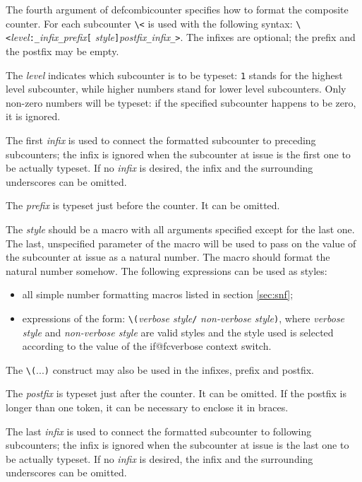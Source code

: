 \documentclass[11pt]{article}
\makeatletter
\def\macroname#1{{\ttfamily\@ttbs#1}}  %
\def\={\verb=}
\def\<#1>{\macroname{#1}}
\makeatother
\begin{document}
The fourth argument of \<defcombicounter> specifies how to format the
composite counter. For each subcounter \=\<= is used with the following
syntax: \=\<=\textit{level}\=:_=\textit{infix}\=_=\textit{prefix}\=[=%
\textit{style}\=]=\textit{postfix}\=_=\textit{infix}\=_>=. The infixes
are optional; the prefix and the postfix may be empty.

The \textit{level} indicates which subcounter is to be typeset:
\=1= stands for the highest level subcounter, while higher numbers stand
for lower level subcounters. Only non-zero numbers will be typeset: if
the specified subcounter happens to be zero, it is ignored.

The first \textit{infix} is used to connect the formatted subcounter to
preceding subcounters; the infix is ignored when the subcounter at issue
is the first one to be actually typeset. If no \textit{infix} is
desired, the infix and the surrounding underscores can be omitted.

The \textit{prefix} is typeset just before the counter. It can be omitted.

The \textit{style} should be a macro with all arguments specified except
for the last one. The last, unspecified parameter of the macro will be
used to pass on the value of the subcounter at issue as a natural number.
The macro should format the natural number somehow. The following expressions
can be used as styles:\begin{itemize}
\item all simple number formatting macros listed in section \ref{sec:snf};
\item expressions of the form: \=\(=\textit{verbose style}\=/=%
      \textit{non-verbose style}\=)=, where \textit{verbose style} and
      \textit{non-verbose style} are valid styles and the style used is
      selected according to the value of the \<if@fcverbose> context switch.
\end{itemize}
The \=\(=...\=)= construct may also be used in the infixes, prefix and
postfix.

The \textit{postfix} is typeset just after the counter. It can be omitted.
If the postfix is longer than one token, it can be necessary to enclose
it in braces.

The last \textit{infix} is used to connect the formatted subcounter to
following subcounters; the infix is ignored when the subcounter at issue
is the last one to be actually typeset. If no \textit{infix} is
desired, the infix and the surrounding underscores can be omitted.
\end{document}
